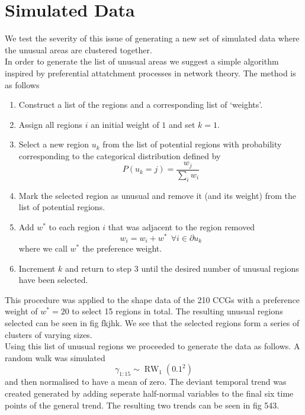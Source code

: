 \documentclass[11pt]{report}
\begin{document}
\section{Simulated Data}

We test the severity of this issue of generating a new set of simulated data where the unusual areas are clustered together. \\

In order to generate the list of unusual areas we suggest a simple algorithm inspired by preferential attatchment processes in network theory. The method is as follows
\begin{enumerate}
\item Construct a list of the regions and a corresponding list of `weights'. 
\item Assign all regions $i$ an initial weight of $1$ and set $k=1$.
\item Select a new region $u_k$ from the list of potential regions with probability corresponding to the categorical distribution defined by
\begin{equation}
P(u_k = j) = \frac{w_j}{\sum_{i} w_i}
\end{equation}
\item Mark the selected region as unusual and remove it (and its weight) from the list of potential regions.
\item Add $w^*$ to each region $i$ that was adjacent to the region removed
\begin{equation}
w_i = w_i + w^* \ \ \forall i \in \partial u_k
\end{equation}
where we call $w^*$ the preference weight.
\item Increment $k$ and return to step 3 until the desired number of unusual regions have been selected. 
\end{enumerate}

This procedure was applied to the shape data of the 210 CCGs with a preference weight of $w^* = 20$ to select 15 regions in total. The resulting unusual regions selected can be seen in fig fkjhk. We see that the selected regions form a series of clusters of varying sizes. \\

Using this list of unusual regions we proceeded to generate the data as follows. A random walk was simulated
\begin{equation*}
\gamma_{1:15} \sim \operatorname{RW}_1(0.1^2)
\end{equation*}
and then normalised to have a mean of zero. The deviant temporal trend was created generated by adding seperate half-normal variables to the final six time points of the general trend. The resulting two trends can be seen in fig 543. \\
\end{document}
